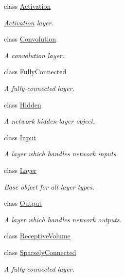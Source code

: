 \begin{DoxyCompactItemize}
\item 
class \hyperlink{classffnn_1_1layer_1_1_activation}{Activation}
\begin{DoxyCompactList}\small\item\em \hyperlink{classffnn_1_1layer_1_1_activation}{Activation} layer. \end{DoxyCompactList}\item 
class \hyperlink{classffnn_1_1layer_1_1_convolution}{Convolution}
\begin{DoxyCompactList}\small\item\em A convolution layer. \end{DoxyCompactList}\item 
class \hyperlink{classffnn_1_1layer_1_1_fully_connected}{Fully\-Connected}
\begin{DoxyCompactList}\small\item\em A fully-\/connected layer. \end{DoxyCompactList}\item 
class \hyperlink{classffnn_1_1layer_1_1_hidden}{Hidden}
\begin{DoxyCompactList}\small\item\em A network hidden-\/layer object. \end{DoxyCompactList}\item 
class \hyperlink{classffnn_1_1layer_1_1_input}{Input}
\begin{DoxyCompactList}\small\item\em A layer which handles network inputs. \end{DoxyCompactList}\item 
class \hyperlink{classffnn_1_1layer_1_1_layer}{Layer}
\begin{DoxyCompactList}\small\item\em Base object for all layer types. \end{DoxyCompactList}\item 
class \hyperlink{classffnn_1_1layer_1_1_output}{Output}
\begin{DoxyCompactList}\small\item\em A layer which handles network outputs. \end{DoxyCompactList}\item 
class \hyperlink{classffnn_1_1layer_1_1_receptive_volume}{Receptive\-Volume}
\item 
class \hyperlink{classffnn_1_1layer_1_1_sparsely_connected}{Sparsely\-Connected}
\begin{DoxyCompactList}\small\item\em A fully-\/connected layer. \end{DoxyCompactList}\end{DoxyCompactItemize}
